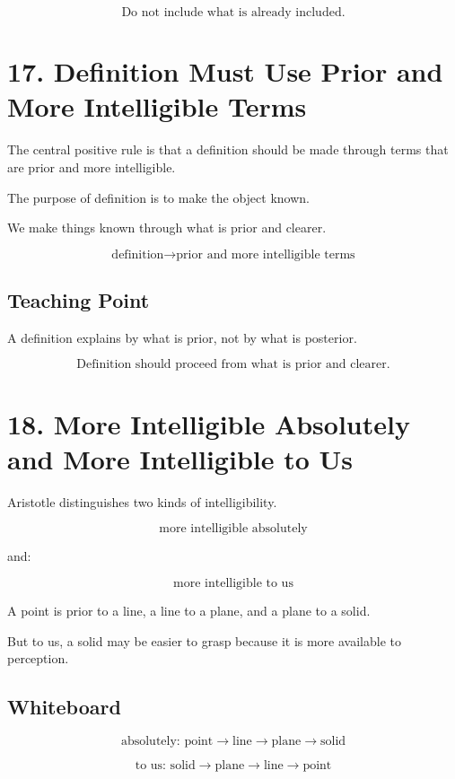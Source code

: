 \documentclass[12pt]{article}
\begin{document}
\[
\boxed{
\text{Do not include what is already included.}
}
\]

\section*{17. Definition Must Use Prior and More Intelligible Terms}

The central positive rule is that a definition should be made through terms that
are prior and more intelligible.

The purpose of definition is to make the object known.

We make things known through what is prior and clearer.

\[
\text{definition} \rightarrow \text{prior and more intelligible terms}
\]

\subsection*{Teaching Point}

A definition explains by what is prior, not by what is posterior.

\[
\boxed{
\text{Definition should proceed from what is prior and clearer.}
}
\]

\section*{18. More Intelligible Absolutely and More Intelligible to Us}

Aristotle distinguishes two kinds of intelligibility.

\[
\text{more intelligible absolutely}
\]

and:

\[
\text{more intelligible to us}
\]

A point is prior to a line, a line to a plane, and a plane to a solid.

But to us, a solid may be easier to grasp because it is more available to
perception.

\subsection*{Whiteboard}

\[
\text{absolutely: point} \rightarrow \text{line} \rightarrow \text{plane} \rightarrow \text{solid}
\]

\[
\text{to us: solid} \rightarrow \text{plane} \rightarrow \text{line} \rightarrow \text{point}
\]
\end{document}
